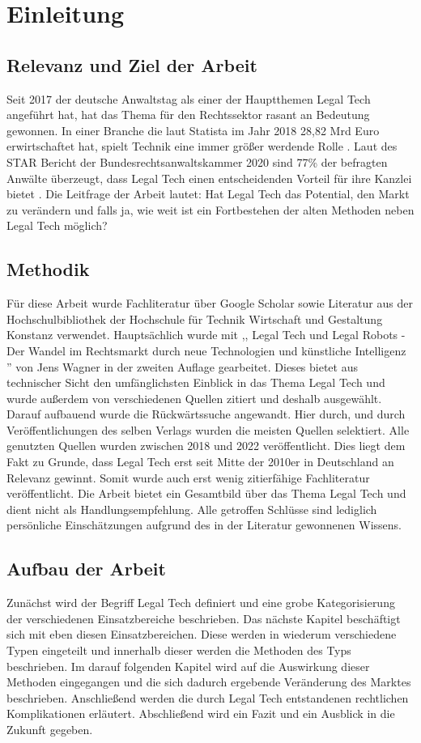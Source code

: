 \chapter{Einleitung}

\section{Relevanz und Ziel der Arbeit}
Seit 2017 der deutsche Anwaltstag als einer der Hauptthemen Legal Tech angeführt hat, hat das Thema für den Rechtssektor rasant an Bedeutung gewonnen. In einer Branche die laut Statista im Jahr 2018 28,82 Mrd Euro erwirtschaftet hat, spielt Technik eine immer größer werdende Rolle . Laut des STAR Bericht der Bundesrechtsanwaltskammer 2020 sind 77\% der befragten Anwälte überzeugt, dass Legal Tech einen entscheidenden Vorteil für ihre Kanzlei bietet . Die Leitfrage der Arbeit lautet: Hat Legal Tech das Potential, den Markt zu verändern und falls ja, wie weit ist ein Fortbestehen der alten Methoden neben Legal Tech möglich?
\section{Methodik}

Für diese Arbeit wurde Fachliteratur über Google Scholar sowie Literatur aus der Hochschulbibliothek der Hochschule für Technik Wirtschaft und Gestaltung Konstanz verwendet. Hauptsächlich wurde mit ,, Legal Tech
und Legal Robots - Der Wandel im Rechtsmarkt
durch neue Technologien
und künstliche Intelligenz '' von Jens Wagner in der zweiten Auflage gearbeitet. Dieses bietet aus technischer Sicht den umfänglichsten Einblick in das Thema Legal Tech und wurde außerdem von verschiedenen Quellen zitiert und deshalb ausgewählt. Darauf aufbauend wurde die Rückwärtssuche angewandt. Hier durch, und durch Veröffentlichungen des selben Verlags wurden die meisten Quellen selektiert. Alle genutzten Quellen wurden zwischen 2018 und 2022 veröffentlicht. Dies liegt dem Fakt zu Grunde, dass Legal Tech erst seit Mitte der 2010er in Deutschland an Relevanz gewinnt. Somit wurde auch erst wenig zitierfähige Fachliteratur veröffentlicht. Die
Arbeit bietet ein Gesamtbild über das Thema Legal Tech und dient
nicht als Handlungsempfehlung. Alle getroffen Schlüsse sind lediglich persönliche Einschätzungen aufgrund des in der Literatur gewonnenen Wissens.

\section{Aufbau der Arbeit}

Zunächst wird der Begriff Legal Tech definiert und eine grobe Kategorisierung der verschiedenen Einsatzbereiche beschrieben. Das nächste Kapitel beschäftigt sich mit eben diesen Einsatzbereichen. Diese werden in wiederum verschiedene Typen eingeteilt und innerhalb dieser werden die Methoden des Typs beschrieben. Im darauf folgenden Kapitel wird auf die Auswirkung dieser Methoden eingegangen und die sich dadurch ergebende Veränderung des Marktes beschrieben. Anschließend werden die durch Legal Tech entstandenen rechtlichen Komplikationen erläutert. Abschließend wird ein Fazit und ein Ausblick in die Zukunft gegeben. 